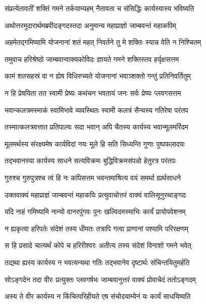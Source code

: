 \twolineshloka
{संप्रत्येतावतीं शक्तिं गमने तर्कयाम्यहम्}
{नैतावता च संसिद्धिः कार्यस्यास्य भविष्यति} %

\twolineshloka
{अथोत्तरमुदारार्थमब्रवीदङ्गदस्तदा}
{अनुमान्य महाप्राज्ञो जाम्बवन्तं महाकपिम्} %

\twolineshloka
{अहमेतद्गमिष्यामि योजनानां शतं महत्}
{निवर्तने तु मे शक्तिः स्यान्न वेति न निश्चितम्} %

\twolineshloka
{तमुवाच हरिश्रेष्ठो जाम्बवान्वाक्यकोविदः}
{ज्ञायते गमने शक्तिस्तव हर्यृक्षसत्तम} %

\twolineshloka
{कामं शतसहस्रं वा न ह्येष विधिरुच्यते}
{योजनानां भवाञ्शक्तो गन्तुं प्रतिनिवर्तितुम्} %

\twolineshloka
{न हि प्रेषयिता तत स्वामी प्रेष्यः कथंचन}
{भवतायं जनः सर्वः प्रेष्यः प्लवगसत्तम} %

\twolineshloka
{भवान्कलत्रमस्माकं स्वामिभावे व्यवस्थितः}
{स्वामी कलत्रं सैन्यस्य गतिरेषा परंतप} %

\twolineshloka
{तस्मात्कलत्रवत्तात प्रतिपाल्यः सदा भवान्}
{अपि चैतस्य कार्यस्य भवान्मूलमरिंदम} %

\twolineshloka
{मूलमर्थस्य संरक्ष्यमेष कार्यविदां नयः}
{मूले हि सति सिध्यन्ति गुणाः पुष्पफलादयः} %

\twolineshloka
{तद्भवानस्या कार्यस्य साधने सत्यविक्रमः}
{बुद्धिविक्रमसंपन्नो हेतुरत्र परंतपः} %

\twolineshloka
{गुरुश्च गुरुपुत्रश्च त्वं हि नः कपिसत्तम}
{भवन्तमाश्रित्य वयं समर्था ह्यर्थसाधने} %

\twolineshloka
{उक्तवाक्यं महाप्राज्ञं जाम्बवन्तं महाकपिः}
{प्रत्युवाचोत्तरं वाक्यं वालिसूनुरथाङ्गदः} %

\twolineshloka
{यदि नाहं गमिष्यामि नान्यो वानरपुंगवः}
{पुनः खल्विदमस्माभिः कार्यं प्रायोपवेशनम्} %

\twolineshloka
{न ह्यकृत्वा हरिपतेः संदेशं तस्य धीमतः}
{तत्रापि गत्वा प्राणानां पश्यामि परिरक्षणम्} %

\twolineshloka
{स हि प्रसादे चात्यर्थं कोपे च हरिरीश्वरः}
{अतीत्य तस्य संदेशं विनाशो गमने भवेत्} %

\twolineshloka
{तद्यथा ह्यस्य कार्यस्य न भवत्यन्यथा गतिः}
{तद्भवानेव दृष्टार्थः संचिन्तयितुमर्हति} %

\twolineshloka
{सोऽङ्गदेन तदा वीरः प्रत्युक्तः प्लवगर्षभः}
{जाम्बवानुत्तरं वाक्यं प्रोवाचेदं ततोऽङ्गदम्} %

\twolineshloka
{अस्य ते वीर कार्यस्य न किंचित्परिहीयते}
{एष संचोदयाम्येनं यः कार्यं साधयिष्यति} %

